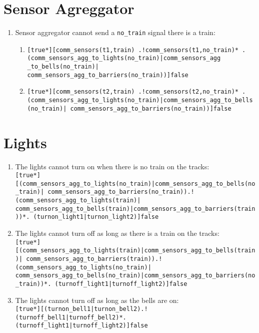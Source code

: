 \documentclass[final]{report}
\begin{document}
\section{Sensor Agreggator}

\begin{enumerate}
\item Sensor aggregator cannot send a \texttt{no\_train} signal there is a train:
\begin{enumerate}[label=\roman*]
\item \texttt{[true*][comm\_sensors(t1,train) .!comm\_sensors(t1,no\_train)* . (comm\_sensors\_agg\_to\_lights(no\_train)|comm\_sensors\_agg \_to\_bells(no\_train)| comm\_sensors\_agg\_to\_barriers(no\_train))]false} 

\item \texttt{[true*][comm\_sensors(t2,train) .!comm\_sensors(t2,no\_train)* . (comm\_sensors\_agg\_to\_lights(no\_train)|comm\_sensors\_agg\_to\_bells(no\_train)| comm\_sensors\_agg\_to\_barriers(no\_train))]false}

\end{enumerate}

\end{enumerate}

\section{Lights}

\begin{enumerate}
    \item The lights cannot turn on when there is no train on the tracks:\\
        \texttt{[true*][(comm\_sensors\_agg\_to\_lights(no\_train)|comm\_sensors\_agg\_to\_bells(no\_train)| comm\_sensors\_agg\_to\_barriers(no\_train)).!(comm\_sensors\_agg\_to\_lights(train)| comm\_sensors\_agg\_to\_bells(train)|comm\_sensors\_agg\_to\_barriers(train))*. (turnon\_light1|turnon\_light2)]false}

    \item The lights cannot turn off as long as there is a train on the tracks:\\
        \texttt{[true*][(comm\_sensors\_agg\_to\_lights(train)|comm\_sensors\_agg\_to\_bells(train)| comm\_sensors\_agg\_to\_barriers(train)).!(comm\_sensors\_agg\_to\_lights(no\_train)| comm\_sensors\_agg\_to\_bells(no\_train)|comm\_sensors\_agg\_to\_barriers(no\_train))*. (turnoff\_light1|turnoff\_light2)]false}

    \item The lights cannot turn off as long as the bells are on:\\
        \texttt{[true*][(turnon\_bell1|turnon\_bell2).!(turnoff\_bell1|turnoff\_bell2)*. (turnoff\_light1|turnoff\_light2)]false}
\end{enumerate}
\end{document}
